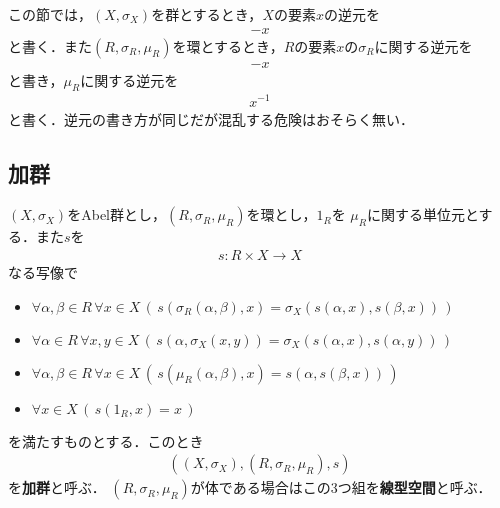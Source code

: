 	この節では，$\left(X,\sigma_X\right)$を群とするとき，$X$の要素$x$の逆元を
	\begin{align}
		-x
	\end{align}
	と書く．また$\left(R,\sigma_R,\mu_R\right)$を環とするとき，$R$の要素$x$の$\sigma_R$に関する逆元を
	\begin{align}
		-x
	\end{align}
	と書き，$\mu_R$に関する逆元を
	\begin{align}
		x^{-1}
	\end{align}
	と書く．逆元の書き方が同じだが混乱する危険はおそらく無い．

\subsection{加群}
	\begin{screen}
		\begin{dfn}[加群]
			$(X,\sigma_X)$をAbel群とし，$(R,\sigma_R,\mu_R)$を環とし，$1_R$を
			$\mu_R$に関する単位元とする．また$s$を
			\begin{align}
				s:R \times X \longrightarrow X
			\end{align}
			なる写像で
			\begin{itemize}
				\item $\forall \alpha,\beta \in R\, \forall x \in X\, \left(\, s(\sigma_R(\alpha,\beta),x)
					= \sigma_X(s(\alpha,x),s(\beta,x))\, \right)$
				\item $\forall \alpha \in R\, \forall x,y \in X\, \left(\, s(\alpha,\sigma_X(x,y))
					= \sigma_X(s(\alpha,x),s(\alpha,y))\, \right)$
				\item $\forall \alpha,\beta \in R\, \forall x \in X\, \left(\, s(\mu_R(\alpha,\beta),x)
					= s(\alpha,s(\beta,x))\, \right)$
				\item $\forall x \in X\, \left(\, s(1_R,x) = x\, \right)$
			\end{itemize}
			を満たすものとする．このとき
			\begin{align}
				\left(\left(X,\sigma_X\right),\left(R,\sigma_R,\mu_R\right),s\right)
			\end{align}
			を{\bf 加群}と呼ぶ．
			$(R,\sigma_R,\mu_R)$が体である場合はこの3つ組を{\bf 線型空間}と呼ぶ．
		\end{dfn}
	\end{screen}
	
